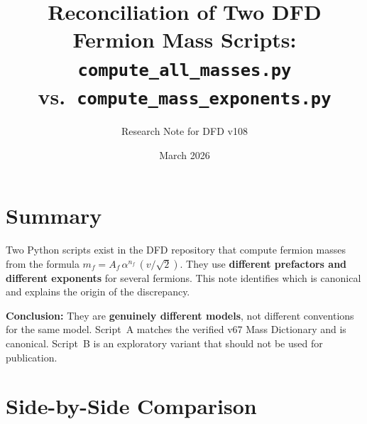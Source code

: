 \documentclass[11pt,a4paper]{article}
\begin{document}
\title{Reconciliation of Two DFD Fermion Mass Scripts:\\
\texttt{compute\_all\_masses.py} vs.\ \texttt{compute\_mass\_exponents.py}}

\author{Research Note for DFD v108}

\date{March 2026}

\maketitle

\section{Summary}

Two Python scripts exist in the DFD repository that compute fermion masses
from the formula $m_f = A_f\,\alpha^{n_f}\,(v/\sqrt{2})$.  They use
\textbf{different prefactors and different exponents} for several fermions.
This note identifies which is canonical and explains the origin of the
discrepancy.

\textbf{Conclusion:} They are \textbf{genuinely different models}, not
different conventions for the same model.  Script~A matches the verified
v67 Mass Dictionary and is canonical.  Script~B is an exploratory variant
that should not be used for publication.

\section{Side-by-Side Comparison}
\end{document}
